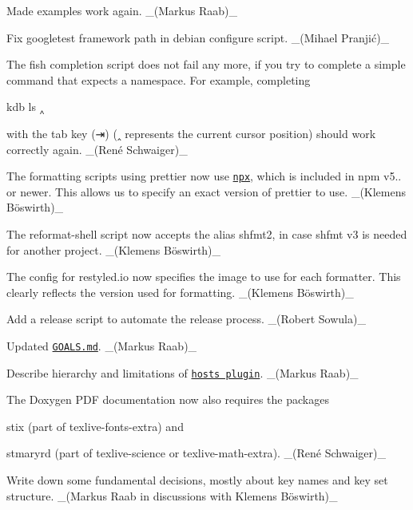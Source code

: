 \begin{DoxyItemize}
\item Made examples work again. \+\_\+(\+Markus Raab)\+\_\+
\end{DoxyItemize}


\begin{DoxyItemize}
\item Fix googletest framework path in debian configure script. \+\_\+(Mihael Pranjić)\+\_\+
\item The fish completion script does not fail any more, if you try to complete a simple command that expects a namespace. For example, completing
\end{DoxyItemize}


\begin{DoxyCode}
kdb ls ‸
\end{DoxyCode}


with the tab key ({\ttfamily ⇥}) ({\ttfamily ‸} represents the current cursor position) should work correctly again. \+\_\+(René Schwaiger)\+\_\+


\begin{DoxyItemize}
\item The formatting scripts using prettier now use \href{https://www.npmjs.com/package/npx}{\tt {\ttfamily npx}}, which is included in {\ttfamily npm} v5.. or newer. This allows us to specify an exact version of prettier to use. \+\_\+(Klemens Böswirth)\+\_\+
\item The {\ttfamily reformat-\/shell} script now accepts the alias {\ttfamily shfmt2}, in case {\ttfamily shfmt} v3 is needed for another project. \+\_\+(Klemens Böswirth)\+\_\+
\item The config for restyled.\+io now specifies the image to use for each formatter. This clearly reflects the version used for formatting. \+\_\+(Klemens Böswirth)\+\_\+
\item Add a release script to automate the release process. \+\_\+(\+Robert Sowula)\+\_\+
\end{DoxyItemize}


\begin{DoxyItemize}
\item Updated \href{http://www.libelektra.org/docgettingstarted/goals}{\tt G\+O\+A\+L\+S.\+md}. \+\_\+(\+Markus Raab)\+\_\+
\item Describe hierarchy and limitations of \href{https://www.libelektra.org/plugins/hosts}{\tt hosts plugin}. \+\_\+(\+Markus Raab)\+\_\+
\item The Doxygen P\+DF documentation now also requires the packages
\begin{DoxyItemize}
\item {\ttfamily stix} (part of {\ttfamily texlive-\/fonts-\/extra}) and
\item {\ttfamily stmaryrd} (part of {\ttfamily texlive-\/science} or {\ttfamily texlive-\/math-\/extra}). \+\_\+(René Schwaiger)\+\_\+
\end{DoxyItemize}
\item Write down some fundamental decisions, mostly about key names and key set structure. \+\_\+(Markus Raab in discussions with Klemens Böswirth)\+\_\+
\end{DoxyItemize}


